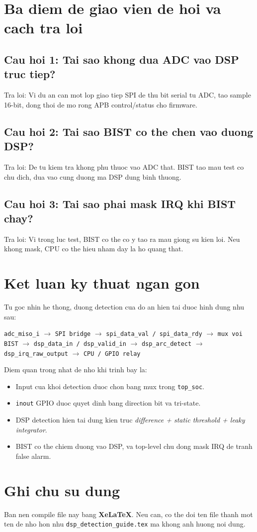 \documentclass[12pt,a4paper]{article}
\begin{document}
\section{Ba diem de giao vien de hoi va cach tra loi}
\subsection*{Cau hoi 1: Tai sao khong dua ADC vao DSP truc tiep?}
Tra loi: Vi du an can mot lop giao tiep SPI de thu bit serial tu ADC, tao sample 16-bit, dong thoi de mo rong APB control/status cho firmware.

\subsection*{Cau hoi 2: Tai sao BIST co the chen vao duong DSP?}
Tra loi: De tu kiem tra khong phu thuoc vao ADC that. BIST tao mau test co chu dich, dua vao cung duong ma DSP dung binh thuong.

\subsection*{Cau hoi 3: Tai sao phai mask IRQ khi BIST chay?}
Tra loi: Vi trong luc test, BIST co the co y tao ra mau giong su kien loi. Neu khong mask, CPU co the hieu nham day la ho quang that.

\section{Ket luan ky thuat ngan gon}
Tu goc nhin he thong, duong detection cua do an hien tai duoc hinh dung nhu sau:
\begin{center}
\texttt{adc\_miso\_i} $\rightarrow$ \texttt{SPI bridge} $\rightarrow$ \texttt{spi\_data\_val / spi\_data\_rdy}
$\rightarrow$ \texttt{mux voi BIST} $\rightarrow$ \texttt{dsp\_data\_in / dsp\_valid\_in}
$\rightarrow$ \texttt{dsp\_arc\_detect} $\rightarrow$ \texttt{dsp\_irq\_raw\_output}
$\rightarrow$ \texttt{CPU / GPIO relay}
\end{center}

Diem quan trong nhat de nho khi trinh bay la:
\begin{itemize}
    \item Input cua khoi detection duoc chon bang mux trong \texttt{top\_soc}.
    \item \texttt{inout} GPIO duoc quyet dinh bang direction bit va tri-state.
    \item DSP detection hien tai dung kien truc \textit{difference + static threshold + leaky integrator}.
    \item BIST co the chiem duong vao DSP, va top-level chu dong mask IRQ de tranh false alarm.
\end{itemize}

\section*{Ghi chu su dung}
Ban nen compile file nay bang \textbf{XeLaTeX}. Neu can, co the doi ten file thanh mot ten de nho hon nhu \texttt{dsp\_detection\_guide.tex} ma khong anh huong noi dung.
\end{document}
